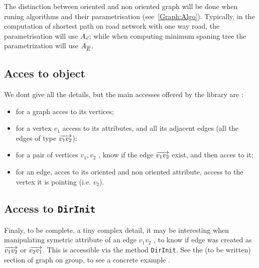 The distinction between oriented and non oriented graph will be done when runing algorithms and their
parametrisation (see~\ref{Graph:Algo}). Typically, in the computation of shortest path on road network
with one way road, the parametrisation will use $A_{\vec{e}}$; while when computing minimum spaning tree 
the parametrization will use  $A_{\overline{E}}$.


\subsection{Acces to object}

We dont give all the details, but the main accesses offered by the library are :

\begin{itemize}
    \item for a graph acces to its vertices;

    \item for a vertex $v_1$ access to its attributes, and all its adjacent edges
          (all the edges of type  $\overrightarrow{v_1 v_2}$);

    \item for a pair of vertices $v_1,v_2$ , know if the edge $\overrightarrow{v_1 v_2}$ exist,
          and then acces to it;

    \item for an edge, acces to its oriented and non oriented attribute, access to the vertex it is pointing (i.e. $v_2$).
\end{itemize}



\subsection{Access to {\tt DirInit}}

Finaly, to be complete, a tiny complex detail, it may be interesting when manipulating symetric
attribute of an edge $v_1v_2$ , to know if edge  was  created as $\overrightarrow{v_1 v_2}$
or $\overrightarrow{v_2 v_1}$. This is accessible via the method {\tt DirInit}.  See the (to
be written) section of graph on group, to see a concrete example .



